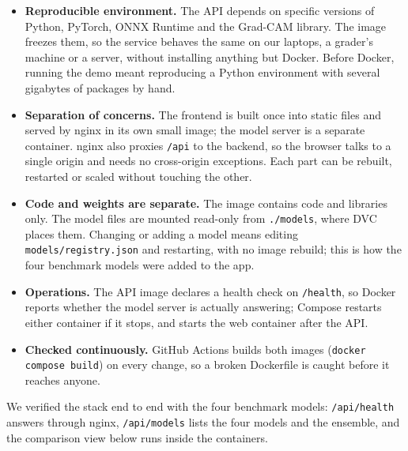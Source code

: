 \begin{itemize}
  \item \textbf{Reproducible environment.} The API depends on specific versions of Python, PyTorch, ONNX Runtime and the Grad-CAM library. The image freezes them, so the service behaves the same on our laptops, a grader's machine or a server, without installing anything but Docker. Before Docker, running the demo meant reproducing a Python environment with several gigabytes of packages by hand.
  \item \textbf{Separation of concerns.} The frontend is built once into static files and served by nginx in its own small image; the model server is a separate container. nginx also proxies \texttt{/api} to the backend, so the browser talks to a single origin and needs no cross-origin exceptions. Each part can be rebuilt, restarted or scaled without touching the other.
  \item \textbf{Code and weights are separate.} The image contains code and libraries only. The model files are mounted read-only from \texttt{./models}, where DVC places them. Changing or adding a model means editing \texttt{models/registry.json} and restarting, with no image rebuild; this is how the four benchmark models were added to the app.
  \item \textbf{Operations.} The API image declares a health check on \texttt{/health}, so Docker reports whether the model server is actually answering; Compose restarts either container if it stops, and starts the web container after the API.
  \item \textbf{Checked continuously.} GitHub Actions builds both images (\texttt{docker compose build}) on every change, so a broken Dockerfile is caught before it reaches anyone.
\end{itemize}
We verified the stack end to end with the four benchmark models: \texttt{/api/health} answers through nginx, \texttt{/api/models} lists the four models and the ensemble, and the comparison view below runs inside the containers.
